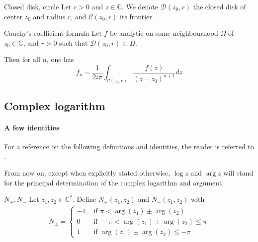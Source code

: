 \documentclass[../main.tex]{subfiles}
\begin{document}
\begin{definition}{{Closed disk, circle}}
	Let $r > 0$ and $z \in \mathbb{C}$. We denote $\mathcal{D} (z_0, r)$ the closed disk of center $z_0$ and radius $r$, and $\mathcal{C} (z_0, r)$ its frontier.
\end{definition}

\begin{thm}{Cauchy's coefficient formula}\label{thm_cauchy_coefficients}
	Let $f$ be analytic on some neighbourhood $\Omega$ of $z_0 \in \mathbb{C}$, and $r > 0$ such that $\mathcal{D} (z_0, r) \subset \Omega$.

	Then for all $n$, one has
	\[
	f_n = \frac{1}{2i\pi} \int_{\mathcal{C} (z_0, r)}
	\frac{f(z)}{{(z - z_0)}^{n+1}} dz
	\]
\end{thm}

%



\subsection*{Complex logarithm}

\paragraph{A few identities}

For a reference on the following definitions and identities, the reader is referred to \cite{Brown1996}.

From now on, except when explicitly stated otherwise, $\log z$ and $\arg z$ will stand for the principal determination of the complex logarithm and argument.

\begin{definition}{{$N_+, N_-$}}
	Let $z_1, z_2 \in \mathbb{C}^*$. Define $N_+(z_1, z_2)$ and $N_-(z_1, z_2)$ with
	\begin{align*}
	N_\pm =
	\begin{cases}
	-1 &\text{ if } \pi < \arg (z_1) \pm \arg (z_2)\\
	0  &\text{ if } - \pi < \arg (z_1) \pm \arg (z_2) \leq \pi \\
	1  &\text{ if } \arg (z_1) \pm \arg (z_2) \leq -\pi
	\end{cases}
	\end{align*}
\end{definition}
\end{document}
